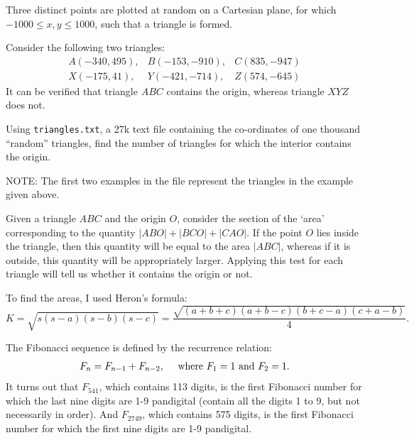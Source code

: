 

\ans{---}



Three distinct points are plotted at random on a Cartesian plane, for which $-1000 \leq x, y \leq 1000$, such that a triangle is formed.

Consider the following two triangles:
\begin{eqnarray*}
A(-340,495), & B(-153,-910), & C(835,-947) \\
X(-175,41),  & Y(-421,-714), & Z(574,-645)
\end{eqnarray*}
It can be verified that triangle $ABC$ contains the origin, whereas triangle $XYZ$ does not.

Using \verb"triangles.txt", a 27k text file containing the co-ordinates of one thousand ``random'' triangles, find the number of triangles for which the interior contains the origin.

\footnotesize
NOTE: The first two examples in the file represent the triangles in the example given above.
\normalsize

Given a triangle $ABC$ and the origin $O$, consider the section of the `area' corresponding to the quantity $|ABO|+|BCO|+|CAO|$.  If the point $O$ lies inside the triangle, then this quantity will be equal to the area $|ABC|$, whereas if it is outside, this quantity will be appropriately larger.  Applying this test for each triangle will tell us whether it contains the origin or not.

To find the areas, I used Heron's formula:
$$K = \sqrt{s(s-a)(s-b)(s-c)} = \frac{\sqrt{(a+b+c)(a+b-c)(b+c-a)(c+a-b)}}{4}.$$






\ans{---}



The Fibonacci sequence is defined by the recurrence relation:
$$ F_{n} = F_{n-1} + F_{n-2}, \quad \hbox{ where }F_1 = 1 \hbox{ and  } F_2 = 1.$$
It turns out that $F_{541}$, which contains 113 digits, is the first Fibonacci number for which the last nine digits are 1-9 pandigital (contain all the digits 1 to 9, but not necessarily in order). And $F_{2749}$, which contains 575 digits, is the first Fibonacci number for which the first nine digits are 1-9 pandigital.

